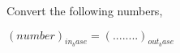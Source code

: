 Convert the following numbers, \hfill{}

$({{ number }})_{ {{ in_base }} } = (........)_{ {{ out_base }}}$


